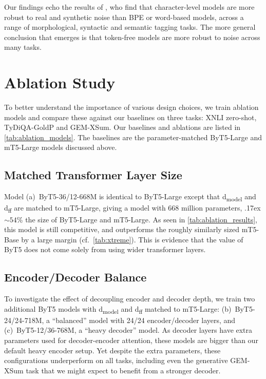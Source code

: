 \documentclass[11pt,a4paper]{article}
\newcommand{\bettertilde}{\raise.17ex\hbox{$\scriptstyle\sim$}}
\begin{document}
Our findings echo the results of \citet{durrani-etal-2019-one}, who find that character-level models are more robust to real and synthetic noise than BPE or word-based models, across a range of morphological, syntactic and semantic tagging tasks. The more general conclusion that emerges is that token-free models are more robust to noise across many tasks.

\section{Ablation Study}
\label{sec:ablations}



To better understand the importance of various design choices, we train ablation models and compare these against our baselines on three tasks: XNLI zero-shot, TyDiQA-GoldP and \mbox{GEM-XSum}. Our baselines and ablations are listed in \cref{tab:ablation_models}. The baselines are the parameter-matched ByT5-Large and mT5-Large models discussed above.

\subsection{Matched Transformer Layer Size}

Model (a)~ByT5-36/12-668M is identical to ByT5-Large except that d\textsubscript{model} and d\textsubscript{ff} are matched to \mbox{mT5-Large}, giving a model with $668$ million parameters, \bettertilde{}$54$\% the size of \mbox{ByT5-Large} and \mbox{mT5-Large}. As seen in \cref{tab:ablation_results}, this model is still competitive, and outperforms the roughly similarly sized \mbox{mT5-Base} by a large margin (cf.~\cref{tab:xtreme}). This is evidence that the value of ByT5 does not come solely from using wider transformer layers.



\subsection{Encoder/Decoder Balance}

To investigate the effect of decoupling encoder and decoder depth, we train two additional ByT5 models with d\textsubscript{model} and d\textsubscript{ff} matched to \mbox{mT5-Large}: (b)~ByT5-24/24-718M, a ``balanced'' model with 24/24 encoder/decoder layers, and (c)~ByT5-12/36-768M, a ``heavy decoder'' model. As decoder layers have extra parameters used for decoder-encoder attention, these models are bigger than our default heavy encoder setup. Yet despite the extra parameters, these configurations underperform on all tasks, including even the generative \mbox{GEM-XSum} task that we might expect to benefit from a stronger decoder.
\end{document}
